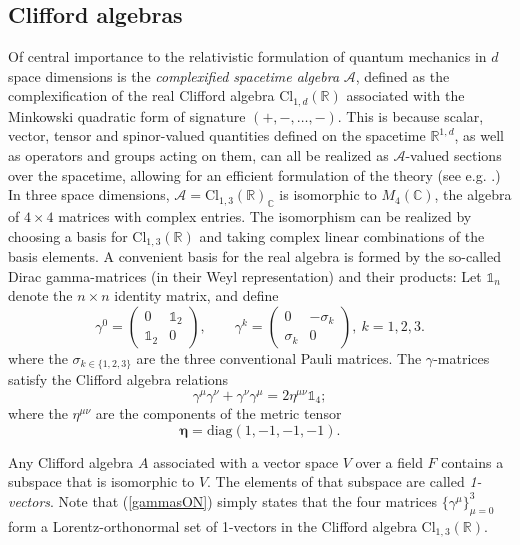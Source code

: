 \documentclass[11pt]{article}
\theoremstyle{definition}
\newcommand{\refeq}[1]{(\ref{#1})}
\numberwithin{equation}{section}
\newcommand{\beq}{\begin{equation}}
\newcommand{\eeq}{\end{equation}}
\newcommand{\Id}{\mathds{1}}
\newcommand{\cA}{\mathcal{A}}
\newcommand{\Cset}{{\mathbb C}}
\newcommand{\Rset}{{\mathbb R}}
\newcommand{\ga}{\gamma}
\newcommand{\si}{\sigma}
\newcommand{\diag}{\mbox{diag}}
\begin{document}
\subsection{Clifford algebras}\label{sec:clifford}
%
 Of central importance to the relativistic formulation of quantum mechanics in $d$ space dimensions is the 
{\em complexified spacetime algebra} $\cA$, defined as the complexification of the real Clifford algebra $\mbox{Cl}_{1,d}(\Rset)$ 
associated with the Minkowski quadratic form of signature $(+,-,\dots,-)$.  
 This is because scalar, vector, tensor and spinor-valued quantities defined on the spacetime $\Rset^{1,d}$, as well as operators 
and groups acting on them, can all be realized as $\cA$-valued sections over the spacetime, allowing for an efficient formulation 
of the theory  (see e.g. \cite{Hes2015}.) 
 In three space dimensions, $\cA = \mbox{Cl}_{1,3}(\Rset)_\Cset$ is isomorphic to $M_4(\Cset)$, the algebra of $4\times 4$ matrices 
with complex entries. 
 The isomorphism can be realized by choosing a basis for $\mbox{Cl}_{1,3}(\Rset)$ and taking complex linear  combinations of the basis elements. 
 A convenient basis for the real algebra is formed  by the so-called Dirac gamma-matrices (in their Weyl representation) and their products: 
 Let $\mathds{1}_n$ denote the $n\times n$ identity matrix, and define
\beq\label{def:gammas}
\ga^0 = \left( \begin{array}{cc}0 & \mathds{1}_2 \\ 
\mathds{1}_2 & 0 \end{array} \right),\qquad \ga^k = \left( \begin{array}{cc}0 & -\si_k \\
 \si_k & 0 \end{array} \right),\ k=1,2,3.
\eeq
where the $\si_{k\in\{1,2,3\}}$ are the three conventional Pauli matrices. 
 The $\ga$-matrices satisfy the Clifford algebra relations
\beq \label{gammasON}
\ga^\mu \ga^\nu + \ga^\nu \ga^\mu = 2 \eta^{\mu\nu}\Id_4;
\eeq
where the $\eta^{\mu\nu}$ are the components of the metric tensor 
\beq
\boldsymbol{\eta} = \diag(1,-1,-1,-1).
\eeq 

Any Clifford algebra $A$ associated with a vector space $V$ over a field $F$ contains a subspace that is isomorphic to $V$. 
 The elements of that subspace are called {\em 1-vectors}.  
Note that \refeq{gammasON} simply states that the four matrices $\{\ga^\mu\}_{\mu=0}^3$ form a Lorentz-orthonormal set of 
1-vectors in the Clifford algebra $\mbox{Cl}_{1,3}(\Rset)$.  
\end{document}
